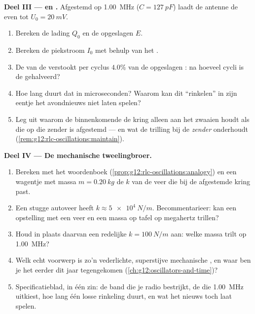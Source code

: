 \begin{problem}
\medskip
\noindent\textbf{Deel III ---  en .}
Afgestemd op \qty{1.00}{MHz} ($C = \qty{127}{pF}$) laadt de antenne de
 even tot $U_0 = \qty{20}{mV}$.
\begin{enumerate}[resume]
  \item Bereken de lading $Q_0$ en de opgeslagen  $E$.
  \item Bereken de piekstroom $I_0$ met behulp van het .
  \item De  van de  verstookt per cyclus $4.0\%$ van de
        opgeslagen : na hoeveel cycli is de  gehalveerd?
  \item Hoe lang duurt dat in microseconden? Waarom kan dit ``rinkelen'' in
        zijn eentje het avondnieuws niet laten spelen?
  \item Leg uit waarom de binnenkomende  de kring alleen aan het zwaaien
        houdt als die op die zender is afgestemd --- en wat de trilling bij de
        \emph{zender} onderhoudt
        (\cref{rem:g12:rlc-oscillations:maintain}).
\end{enumerate}

\medskip
\noindent\textbf{Deel IV --- De mechanische tweelingbroer.}
\begin{enumerate}[resume]
  \item Bereken met het woordenboek (\cref{prop:g12:rlc-oscillations:analogy})
        en een wagentje met massa $m = \qty{0.20}{kg}$ de  $k$ van
        de veer die bij de afgestemde kring past.
  \item Een stugge autoveer heeft $k \approx \qty{5e4}{N/m}$. Becommentarieer:
        kan een opstelling met een veer en een massa op tafel op megahertz
        trillen?
  \item Houd in plaats daarvan een redelijke $k = \qty{100}{N/m}$ aan: welke
        massa trilt op \qty{1.00}{MHz}?
  \item Welk echt voorwerp is zo'n vederlichte, superstijve mechanische
        , en waar ben je het eerder dit jaar tegengekomen
        (\cref{ch:g12:oscillators-and-time})?
  \item Specificatieblad, in één zin: de band die je radio bestrijkt, de
         die \qty{1.00}{MHz} uitkiest, hoe lang één losse rinkeling
        duurt, en wat het nieuws toch laat spelen.
\end{enumerate}
\end{problem}
